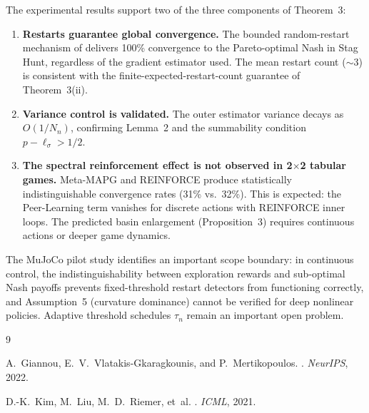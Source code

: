 \documentclass[11pt,a4paper]{article}
\theoremstyle{remark}
\begin{document}
The experimental results support two of the three components of Theorem~3:
\begin{enumerate}[itemsep=3pt]
  \item \textbf{Restarts guarantee global convergence.}
    The bounded random-restart mechanism of \citet{Giannou2022} delivers
    100\% convergence to the Pareto-optimal Nash in Stag Hunt,
    regardless of the gradient estimator used.
    The mean restart count ($\sim$3) is consistent with the
    finite-expected-restart-count guarantee of Theorem~3(ii).
  \item \textbf{Variance control is validated.}
    The outer estimator variance decays as $O(1/N_n)$,
    confirming Lemma~2 and the summability condition
    $p - \ell_\sigma > 1/2$.
  \item \textbf{The spectral reinforcement effect is not observed
    in 2$\times$2 tabular games.}
    Meta-MAPG and REINFORCE produce statistically indistinguishable
    convergence rates (31\% vs.\ 32\%).
    This is expected: the Peer-Learning term vanishes for discrete
    actions with REINFORCE inner loops.
    The predicted basin enlargement (Proposition~3) requires
    continuous actions or deeper game dynamics.
\end{enumerate}

The MuJoCo pilot study identifies an important scope boundary:
in continuous control, the indistinguishability between exploration
rewards and sub-optimal Nash payoffs prevents fixed-threshold restart
detectors from functioning correctly, and Assumption~5 (curvature
dominance) cannot be verified for deep nonlinear policies.
Adaptive threshold schedules $\tau_n$ remain an important open problem.

\begin{thebibliography}{9}

A.~Giannou, E.~V.~Vlatakis-Gkaragkounis, and P.~Mertikopoulos.
.
\newblock \emph{NeurIPS}, 2022.

D.-K.~Kim, M.~Liu, M.~D.~Riemer, et~al.
.
\newblock \emph{ICML}, 2021.

\end{thebibliography}
\end{document}
